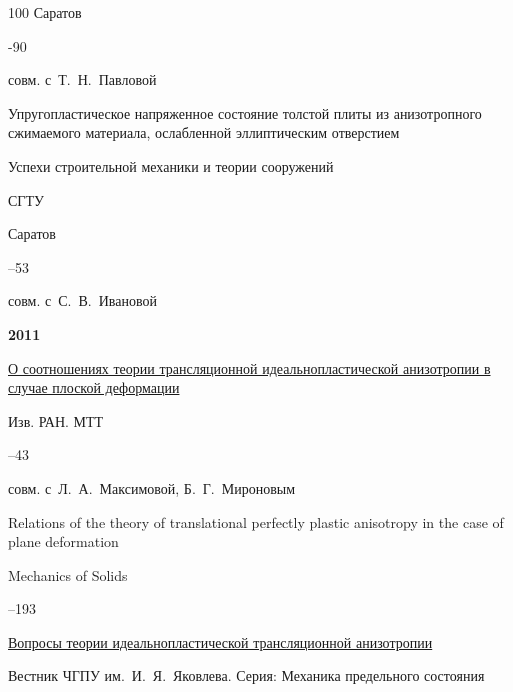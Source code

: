 \begin{thebibliography}{100}
\publaddr Саратов


-90

\miscnote совм. с~Т.~Н.~Павловой




\paper Упругопластическое напряженное состояние толстой плиты из анизотропного сжимаемого материала, ослабленной эллиптическим отверстием 

\inbook Успехи строительной механики и теории сооружений

\publ СГТУ

\publaddr Саратов


--53 

\miscnote совм. с~С.~В.~Ивановой



\item[] \centerline{\bf 2011}




\paper \href{http://elibrary.ru/item.asp?id=15785029}{О соотношениях теории трансляционной идеальнопластической анизотропии в случае плоской деформации}

\jour Изв. РАН. МТТ



--43 

\miscnote совм. с~Л.~А.~Максимовой, Б.~Г.~Мироновым


\transl

\paper Relations of the theory of translational perfectly plastic anisotropy in the case of plane deformation

\jour Mechanics of Solids



--193






\paper \href{http://elibrary.ru/item.asp?id=16535351}{Вопросы теории идеальнопластической трансляционной анизотропии}

\jour Вестник \mbox{ЧГПУ} им.~И.~Я.~Яковлева. Серия: Механика предельного состояния


\end{thebibliography}
